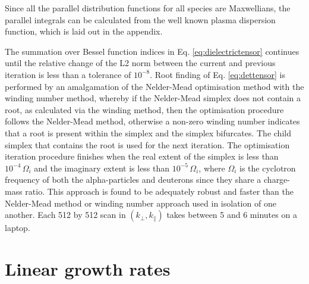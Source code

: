 \documentclass[12pt]{iopart}
\begin{document}
Since all the parallel distribution functions for all species are Maxwellians,
the parallel integrals can be calculated from the well known plasma dispersion
function\cite{Fried1961}, which is laid out in the appendix.

The summation over Bessel function indices in Eq. \ref{eq:dielectrictensor}
continues until the relative change of the L2 norm between the current and
previous iteration is less than a tolerance of $10^{-8}$. Root finding of Eq.
\ref{eq:dettensor} is performed by an amalgamation of the
Nelder-Mead\cite{Nelder1965} optimisation method with the winding number method,
whereby if the Nelder-Mead simplex does not contain a root, as calculated via
the winding method, then the optimisation procedure follows the Nelder-Mead
method, otherwise a non-zero winding number indicates that a root is present
within the simplex and the simplex
bifurcates. The child simplex that contains the root is used for the next
iteration. The optimisation iteration procedure finishes when the real extent of
the simplex is less than $10^{-4}\, \Omega_i$ and the imaginary extent is less
than $10^{-5}\,\Omega_i$, where $\Omega_i$ is the cyclotron frequency of both
the alpha-particles and deuterons since they share a charge-mass ratio.
This approach is found to be adequately robust and
faster than the Nelder-Mead method or winding number approach used in isolation
of one another. Each 512 by 512 scan in $(k_\perp, k_\parallel)$ takes between 5
and 6 minutes on a laptop.

\section{Linear growth rates}
\end{document}
